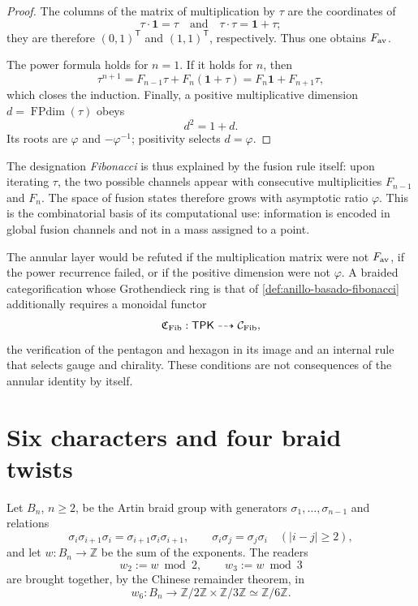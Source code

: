 \begin{proof}
The columns of the matrix of multiplication by \(\tau\) are the coordinates
of
\[
 \tau\cdot\mathbf 1=\tau
 \quad\text{and}\quad
 \tau\cdot\tau=\mathbf 1+\tau;
\]
they are therefore \((0,1)^{\mathsf T}\) and \((1,1)^{\mathsf T}\), respectively.
Thus one obtains \(F_{\rm av}\).

The power formula holds for \(n=1\). If it holds for \(n\), then
\[
 \tau^{n+1}
 =F_{n-1}\tau+F_n(\mathbf 1+\tau)
 =F_n\mathbf 1+F_{n+1}\tau,
\]
which closes the induction. Finally, a positive multiplicative dimension
\(d=\operatorname{FPdim}(\tau)\) obeys
\[
 d^2=1+d.
\]
Its roots are \(\varphi\) and \(-\varphi^{-1}\); positivity selects
\(d=\varphi\).
\end{proof}

The designation \emph{Fibonacci} is thus explained by the fusion
rule itself: upon iterating \(\tau\), the two possible channels appear with
consecutive multiplicities \(F_{n-1}\) and \(F_n\). The space of fusion states
therefore grows with asymptotic ratio \(\varphi\). This is the
combinatorial basis of its computational use: information is encoded in global
fusion channels and not in a mass assigned to a point.

\begin{criterion}
\label{crit:categorificacion-fibonacci}
The annular layer would be refuted if the multiplication matrix were not
\(F_{\rm av}\), if the power recurrence failed, or if the positive
dimension were not \(\varphi\). A braided categorification whose
Grothendieck ring is that of \cref{def:anillo-basado-fibonacci} additionally requires a
monoidal functor
\[
 \mathfrak C_{\rm Fib}:\mathsf{TPK}
 \dashrightarrow\mathcal C_{\rm Fib},
\]
the verification of the pentagon and hexagon in its image and an internal rule that
selects gauge and chirality.
These conditions are not consequences of the annular identity by itself.
\end{criterion}

\section[Braid Characters]{Six characters and four braid twists}
\label{sec:rescate-trenzas-ex02}

Let \(B_n\), \(n\geq2\), be the Artin braid group with generators
\(\sigma_1,\ldots,\sigma_{n-1}\) and relations
\[
 \sigma_i\sigma_{i+1}\sigma_i
 =\sigma_{i+1}\sigma_i\sigma_{i+1},
 \qquad
 \sigma_i\sigma_j=\sigma_j\sigma_i\quad(|i-j|\geq2),
\]
and let \(w:B_n\to\mathbb Z\) be the sum of the exponents. The readers
\[
 w_2:=w\bmod2,\qquad w_3:=w\bmod3
\]
are brought together, by the Chinese remainder theorem, in
\[
 w_6:B_n\longrightarrow
 \mathbb Z/2\mathbb Z\times\mathbb Z/3\mathbb Z
 \simeq\mathbb Z/6\mathbb Z.
\]

